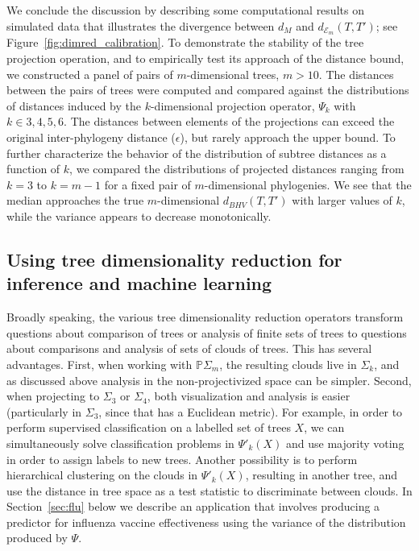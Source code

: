 \documentclass[a4paper,11pt]{article}
\newcommand{\aE}{\mathcal{E}}
\begin{document}
We conclude the discussion by describing some computational results on simulated data that illustrates the divergence between $d_M$ and $d_{\aE_m}(T,T')$; see Figure~\ref{fig:dimred_calibration}.
To demonstrate the stability of the tree projection operation, and to empirically test its approach of the distance bound, we constructed a panel of pairs of $m$-dimensional trees, $m > 10$.
The distances between the pairs of trees were computed and compared against the distributions of distances induced by the $k$-dimensional projection operator, $\Psi_k$ with $k \in {3,4,5,6}$.
The distances between elements of the projections can exceed the original inter-phylogeny distance ($\epsilon$), but rarely approach the upper bound.
To further characterize the behavior of the distribution of subtree distances as a function of $k$, we compared the distributions of projected distances ranging from $k=3$ to $k=m-1$ for a fixed pair of $m$-dimensional phylogenies.
We see that the median approaches the true $m$-dimensional $d_{BHV}(T, T')$ with larger values of $k$, while the variance appears to decrease monotonically.

\subsection{Using tree dimensionality reduction for inference and machine learning}

Broadly speaking, the various tree dimensionality reduction operators transform questions about comparison of trees or analysis of finite sets of trees to questions about comparisons and analysis of sets of clouds of trees.
This has several advantages.
First, when working with $\mathbb{P}\Sigma_m$, the resulting clouds live in $\Sigma_k$, and as discussed above analysis in the non-projectivized space can be simpler.
Second, when projecting to $\Sigma_3$ or $\Sigma_4$, both visualization and analysis is easier (particularly in $\Sigma_3$, since that has a Euclidean metric).
For example, in order to perform supervised classification on a labelled set of trees $X$, we can simultaneously solve classification problems in $\Psi'_k(X)$ and use majority voting in order to assign labels to new trees.
Another possibility is to perform hierarchical clustering on the clouds in $\Psi'_k(X)$, resulting in another tree, and use the distance in tree space as a test statistic to discriminate between clouds.
In Section~\ref{sec:flu} below we describe an application that involves producing a predictor for influenza vaccine effectiveness using the variance of the distribution produced by $\Psi$.
\end{document}

